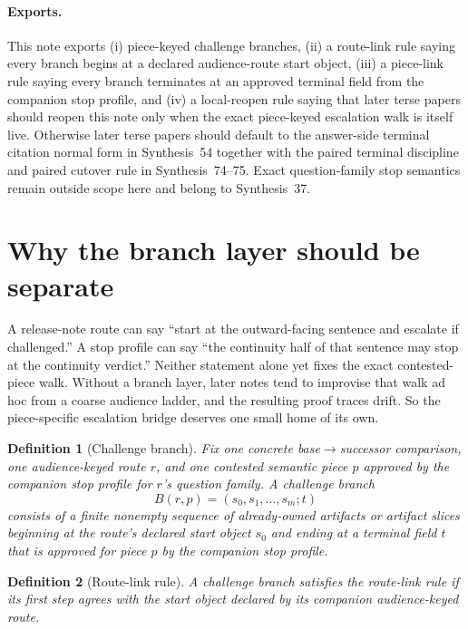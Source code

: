 \documentclass[11pt]{article}
\newtheorem{definition}{Definition}
\begin{document}
\paragraph{Exports.}
This note exports (i) piece-keyed challenge branches, (ii) a route-link rule saying every branch begins at a declared audience-route start object, (iii) a piece-link rule saying every branch terminates at an approved terminal field from the companion stop profile, and (iv) a local-reopen rule saying that later terse papers should reopen this note only when the exact piece-keyed escalation walk is itself live. Otherwise later terse papers should default to the answer-side terminal citation normal form in Synthesis~54 together with the paired terminal discipline and paired cutover rule in Synthesis~74--75. Exact question-family stop semantics remain outside scope here and belong to Synthesis~37.\cite{series:challengestops,series:challengeanswerreviewmenus,series:pairedterminalcitationdiscipline,series:pairedterminalcutoverrules}

\section{Why the branch layer should be separate}
A release-note route can say ``start at the outward-facing sentence and escalate if challenged.''
A stop profile can say ``the continuity half of that sentence may stop at the continuity verdict.''
Neither statement alone yet fixes the exact contested-piece walk.
Without a branch layer, later notes tend to improvise that walk ad hoc from a coarse audience ladder, and the resulting proof traces drift.
So the piece-specific escalation bridge deserves one small home of its own.

\begin{definition}[Challenge branch]
Fix one concrete base$\to$successor comparison, one audience-keyed route $r$, and one contested semantic piece $p$ approved by the companion stop profile for $r$'s question family.
A \emph{challenge branch}
\[
B(r,p)=(s_0,s_1,\dots,s_m; t)
\]
consists of a finite nonempty sequence of already-owned artifacts or artifact slices beginning at the route's declared start object $s_0$ and ending at a terminal field $t$ that is approved for piece $p$ by the companion stop profile.
\end{definition}

\begin{definition}[Route-link rule]
A challenge branch satisfies the \emph{route-link rule} if its first step agrees with the start object declared by its companion audience-keyed route.
\end{definition}
\end{document}

